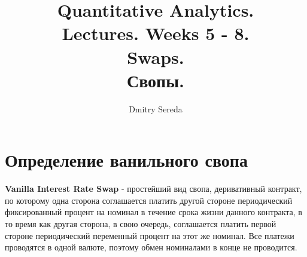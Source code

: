 \documentclass{article}
\title{Quantitative Analytics.\\
Lectures. Weeks 5 - 8. \\
Swaps. \\
Свопы.}
\author{Dmitry Sereda}
\begin{document}
\maketitle

\setcounter{tocdepth}{1} %
\renewcommand\contentsname{Оглавление}
\tableofcontents
\newpage




\renewcommand{\labelitemi}{\tiny$\bullet$}
\renewcommand{\figurename}{Fig.}

 \section{Определение ванильного свопа}
 \textbf {Vanilla Interest Rate Swap} - простейший вид свопа, деривативный контракт, по которому одна сторона соглашается платить другой стороне периодический фиксированный процент на номинал в течение срока жизни данного контракта, в то время как другая сторона, в свою очередь, соглашается платить первой стороне периодический переменный процент на этот же номинал. Все платежи проводятся в одной валюте, поэтому обмен номиналами в конце не проводится.
\end{document}
